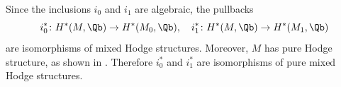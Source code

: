 \begin{rmk}
Since the inclusions $i_0$ and $i_1$ are algebraic, the pullbacks
\begin{equation}
i_0^* \colon H^*(M, \Qb) \to H^*(M_0, \Qb), \quad i_1^* \colon H^*(M, \Qb) \to H^*(M_1, \Qb)
\end{equation}
are isomorphisms of mixed Hodge structures. Moreover, $M$ has pure Hodge structure, as shown in \cite[Corollary 1.3.2]{Hausel-RodriguezVillega}. Therefore $i_0^*$ and $i_1^*$ are isomorphisms of pure mixed Hodge structures.
\end{rmk}
